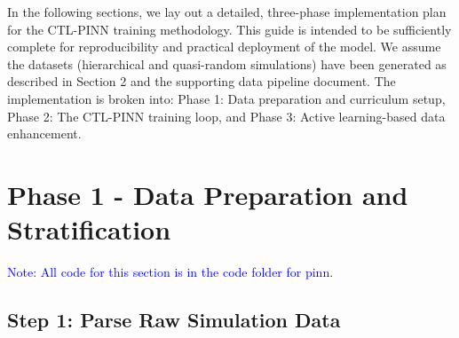 \documentclass{article}
\begin{document}
In the following sections, we lay out a detailed, three-phase implementation plan for the CTL-PINN training methodology.  
This guide is intended to be sufficiently complete for reproducibility and practical deployment of the model.  
We assume the datasets (hierarchical and quasi-random simulations) have been generated as described in Section 2 and the supporting data pipeline document.  
The implementation is broken into: Phase 1: Data preparation and curriculum setup, Phase 2: The CTL-PINN training loop, and Phase 3: Active learning-based data enhancement. 

\section{Phase 1 - Data Preparation and Stratification}

\textcolor{blue}{Note: All code for this section is in the code folder for pinn.}

\subsection{Step 1: Parse Raw Simulation Data}
\end{document}
